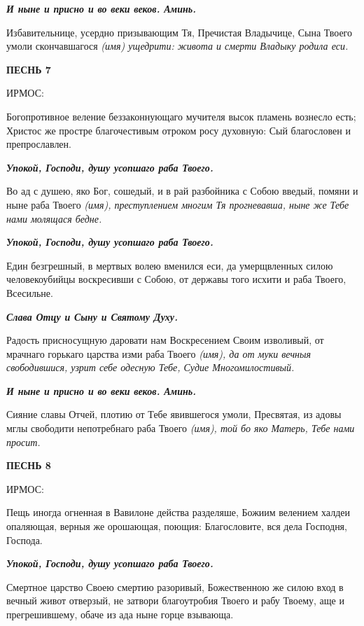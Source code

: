 \itshape \bfseries И ныне и присно и во веки веков. Аминь.\normalfont{}\normalfont{}


Избавительнице, усердно призывающим Тя, Пречистая Владычице, Сына Твоего умоли скончавшагося \itshape (имя)\normalfont{} ущедрити: живота и смерти Владыку родила еси. 


\bfseries ПЕСНЬ 7


ИРМОС:\normalfont{}


Богопротивное веление беззаконнующаго мучителя высок пламень вознесло есть; Христос же простре благочестивым отроком росу духовную: Сый благословен и препрославлен.


\itshape \bfseries Упокой, Господи, душу усопшаго раба Твоего.\normalfont{}\normalfont{}


Во ад с душею, яко Бог, сошедый, и в рай разбойника с Собою введый, помяни и ныне раба Твоего \itshape (имя)\normalfont{}, преступлением многим Тя прогневавша, ныне же Тебе нами молящася бедне.


\itshape \bfseries Упокой, Господи, душу усопшаго раба Твоего.\normalfont{}\normalfont{}


Един безгрешный, в мертвых волею вменился еси, да умерщвленных силою человекоубийцы воскресивши с Собою, от державы того исхити и раба Твоего, Всесильне.


\itshape \bfseries Слава Отцу и Сыну и Святому Духу.\normalfont{}\normalfont{}


Радость присносущную даровати нам Воскресением Своим изволивый, от мрачнаго горькаго царства изми раба Твоего \itshape (имя)\normalfont{}, да от муки вечныя свободившися, узрит себе одесную Тебе, Судие Многомилостивый.


\itshape \bfseries И ныне и присно и во веки веков. Аминь.\normalfont{}\normalfont{}


Сияние славы Отчей, плотию от Тебе явившегося умоли, Пресвятая, из адовы мглы свободити непотребнаго раба Твоего \itshape (имя)\normalfont{}, той бо яко Матерь, Тебе нами просит. 


\bfseries ПЕСНЬ 8


ИРМОС:\normalfont{}


Пещь иногда огненная в Вавилоне действа разделяше, Божиим велением халдеи опаляющая, верныя же орошающая, поющия: Благословите, вся дела Господня, Господа.


\itshape \bfseries Упокой, Господи, душу усопшаго раба Твоего.\normalfont{}\normalfont{}


Смертное царство Своею смертию разоривый, Божественною же силою вход в вечный живот отверзый, не затвори благоутробия Твоего и рабу Твоему, аще и прегрешившему, обаче из ада ныне горце взывающа.


